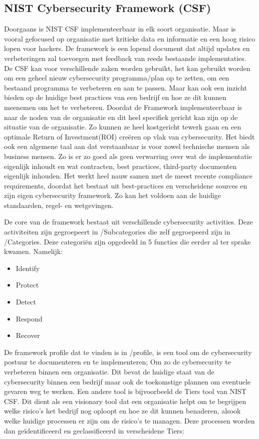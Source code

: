 \subsection{NIST Cybersecurity Framework (CSF)}

Doorgaans is NIST CSF implementeerbaar in elk soort organisatie. Maar is vooral gefocused op organisatie met kritieke data en informatie en een hoog risico lopen voor hackers.
De framework is een lopend document dat altijd updates en verbeteringen zal toevoegen met feedback van reeds bestaande implementaties. \autocite{Calder2018}
De CSF kan voor verschillende zaken worden gebruikt, het kan gebruikt worden om een geheel nieuw cybersecurity programma/plan op te zetten, om een bestaand programma te verbeteren en aan te passen. Maar kan ook een inzicht bieden op de huidige best practices van een bedrijf en hoe ze dit kunnen meenemen om het te verbeteren.
Doordat de Framework implementeerbaar is naar de noden van de organisatie en dit heel specifiek gericht kan zijn op de situatie van de organisatie. Zo kunnen ze heel kostgericht tewerk gaan en een optimale Return of Investment(ROI) creëren op vlak van cybersecurity.
Het biedt ook een algemene taal aan dat verstaanbaar is voor zowel technische mensen als business mensen. Zo is er zo goed als geen verwarring over wat de implementatie eigenlijk inhoudt en wat contracten, best practices, third-party documenten eigenlijk inhouden.
Het werkt heel nauw samen met de meest recente compliance requirements, doordat het bestaat uit best-practices en verscheidene sources en zijn eigen cybersecurity framework. Zo kan het voldoen aan de huidige standaarden, regel- en wetgevingen. \autocite{Calder2018}

De core van de framework bestaat uit verschillende cybersecurity activities. Deze activiteiten zijn gegroepeert in /Subcategories die zelf gegroepeerd zijn in /Categories. Deze categoriën zijn opgedeeld in 5 functies die eerder al ter sprake kwamen.
Namelijk:

\begin{itemize}
    \item Identify
    \item Protect
    \item Detect
    \item Respond
    \item Recover
\end{itemize}

De framework profile dat te vinden is in /profile, is een tool om de cybersecurity postuur te documenteren en te implementeren; Om zo de cybersecurity te verbeteren binnen een organisatie.
Dit bevat de huidige staat van de cybersecurity binnen een bedrijf maar ook de toekomstige plannen om eventuele gevaren weg te werken. \autocite{Sultan2017}
Een andere tool is bijvoorbeeld de Tiers tool van NIST CSF. Dit dient als een visionary tool dat een organisatie helpt om te begrijpen welke risico's het bedrijf nog oploopt en hoe ze dit kunnen benaderen, alsook welke huidige processen er zijn om de risico's te managen.
Deze processen worden dan geïdentificeerd en geclassificeerd in verscheidene Tiers: \autocite{Sultan2017}

